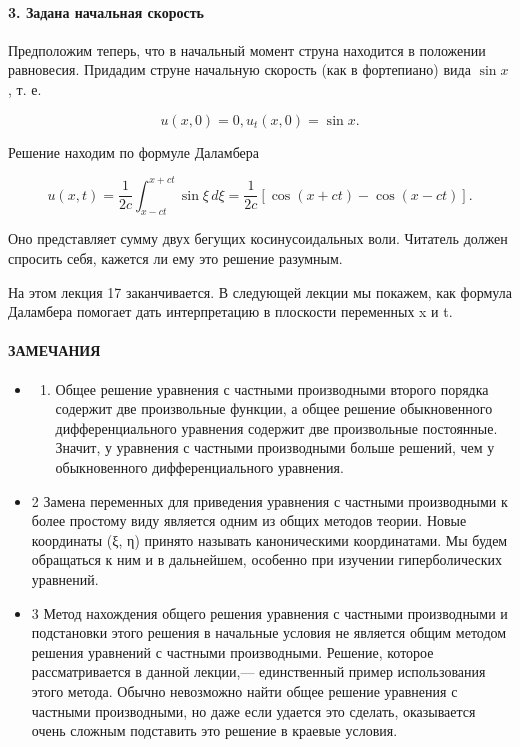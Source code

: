 \documentclass[
  ukrainian,
]{article}
\providecommand{\tightlist}{%
  \setlength{\itemsep}{0pt}\setlength{\parskip}{0pt}}
\begin{document}
\paragraph{3. Задана начальная
скорость}\label{ux437ux430ux434ux430ux43dux430-ux43dux430ux447ux430ux43bux44cux43dux430ux44f-ux441ux43aux43eux440ux43eux441ux442ux44c}

Предположим теперь, что в начальный момент струна находится в положении
равновесия. Придадим струне начальную скорость (как в фортепиано) вида
\(\sin x\) , т. е.

\[
u(x, 0) = 0,
u_t(x, 0) = \sin x.
\]

Решение находим по формуле Даламбера

\[
u(x, t) = \frac{1}{2c} \int_{x-ct}^{x+ct} \sin \xi \, d\xi = \frac{1}{2c} \left[ \cos (x+ct) - \cos (x-ct) \right].
\]

Оно представляет сумму двух бегущих косинусоидальных воли. Читатель
должен спросить себя, кажется ли ему это решение разумным.

На этом лекция 17 заканчивается. В следующей лекции мы покажем, как
формула Даламбера помогает дать интерпретацию в плоскости переменных x и
t.

\paragraph{ЗАМЕЧАНИЯ}\label{ux437ux430ux43cux435ux447ux430ux43dux438ux44f-2}

\begin{itemize}
\tightlist
\item
  \begin{enumerate}
  \def\labelenumi{\arabic{enumi}.}
  \tightlist
  \item
    Общее решение уравнения с частными производными второго порядка
    содержит две произвольные функции, а общее решение обыкновенного
    дифференциального уравнения содержит две произвольные постоянные.
    Значит, у уравнения с частными производными больше решений, чем у
    обыкновенного дифференциального уравнения.
  \end{enumerate}
\item
  2 Замена переменных для приведения уравнения с частными производными к
  более простому виду является одним из общих методов теории. Новые
  координаты (ξ, η) принято называть каноническими координатами. Мы
  будем обращаться к ним и в дальнейшем, особенно при изучении
  гиперболических уравнений.
\item
  3 Метод нахождения общего решения уравнения с частными производными и
  подстановки этого решения в начальные условия не является общим
  методом решения уравнений с частными производными. Решение, которое
  рассматривается в данной лекции,--- единственный пример использования
  этого метода. Обычно невозможно найти общее решение уравнения с
  частными производными, но даже если удается это сделать, оказывается
  очень сложным подставить это решение в краевые условия.
\end{itemize}
\end{document}
